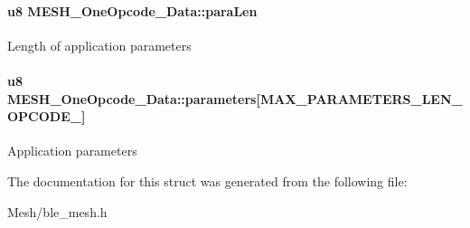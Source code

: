 \paragraph[{\texorpdfstring{para\+Len}{paraLen}}]{\setlength{\rightskip}{0pt plus 5cm}u8 M\+E\+S\+H\+\_\+\+One\+Opcode\+\_\+\+Data\+::para\+Len}\hypertarget{struct_m_e_s_h___one_opcode___data_a839db720711b58134f992f17a37324fd}{}\label{struct_m_e_s_h___one_opcode___data_a839db720711b58134f992f17a37324fd}
Length of application parameters 
\paragraph[{\texorpdfstring{parameters}{parameters}}]{\setlength{\rightskip}{0pt plus 5cm}u8 M\+E\+S\+H\+\_\+\+One\+Opcode\+\_\+\+Data\+::parameters\mbox{[}{\bf M\+A\+X\+\_\+\+P\+A\+R\+A\+M\+E\+T\+E\+R\+S\+\_\+\+L\+E\+N\+\_\+\+O\+P\+C\+O\+D\+E\+\_}\mbox{]}}\hypertarget{struct_m_e_s_h___one_opcode___data_a61be93265e85bd8813c7fb0e5b93a99c}{}\label{struct_m_e_s_h___one_opcode___data_a61be93265e85bd8813c7fb0e5b93a99c}
Application parameters 

The documentation for this struct was generated from the following file\+:\begin{DoxyCompactItemize}
\item 
Mesh/ble\+\_\+mesh.\+h\end{DoxyCompactItemize}
